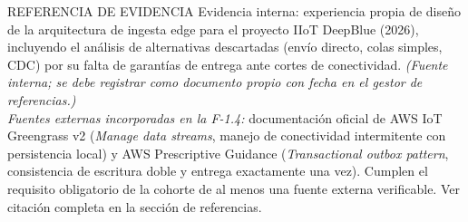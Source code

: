 \documentclass[11pt,a4paper]{article}
\begin{document}
\begin{seccion}{\faBook}{REFERENCIA DE EVIDENCIA}
{\small
Evidencia interna: experiencia propia de diseño de la arquitectura de ingesta edge para el proyecto IIoT DeepBlue (2026), incluyendo el análisis de alternativas descartadas (envío directo, colas simples, CDC) por su falta de garantías de entrega ante cortes de conectividad. \textit{(Fuente interna; se debe registrar como documento propio con fecha en el gestor de referencias.)}\\[4pt]
\textit{Fuentes externas incorporadas en la F-1.4:} documentación oficial de AWS IoT Greengrass v2 (\emph{Manage data streams}, manejo de conectividad intermitente con persistencia local) y AWS Prescriptive Guidance (\emph{Transactional outbox pattern}, consistencia de escritura doble y entrega exactamente una vez). Cumplen el requisito obligatorio de la cohorte de al menos una fuente externa verificable. Ver citación completa en la sección de referencias.
}
\end{seccion}
\end{document}
